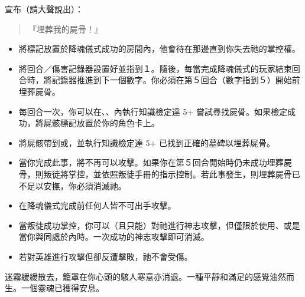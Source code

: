 宣布（請大聲說出）：
\begin{quote}
  『埋葬我的屍骨！』
\end{quote}
\vspace*{-1em}
\begin{itemize}
  \item 將標記放置於降魂儀式成功的房間內，他會待在那邊直到你失去祂的掌控權。
  \item 將回合／傷害記錄器設置好並指到１。隨後，每當完成降魂儀式的玩家結束回合時，將記錄器推進到下一個數字。你必須在第５回合（數字指到５）開始前埋葬屍骨。
  \item 每回合一次，你可以在、、內執行知識檢定達 5+ 嘗試尋找屍骨。如果檢定成功，將屍骸標記放置於你的角色卡上。
  \item 將屍骸帶到或，並執行知識檢定達 5+ 已找到正確的墓碑以埋葬屍骨。
  \item 當你完成此事，將不再可以攻擊。如果你在第５回合開始時仍未成功埋葬屍骨，則叛徒將掌控，並依照叛徒手冊的指示控制。若此事發生，則埋葬屍骨已不足以安撫，你必須消滅祂。
\end{itemize}

\vspace*{-1em}
\begin{itemize}
  \item 在降魂儀式完成前任何人皆不可出手攻擊。
  \item 當叛徒成功掌控，你可以（且只能）對祂進行神志攻擊，但僅限於使用、或是當你與同處於內時。一次成功的神志攻擊即可消滅。
  \item 若對英雄進行攻擊但卻反遭擊敗，祂不會受傷。
\end{itemize}

\begin{HauntStory}
  迷霧緩緩散去，籠罩在你心頭的駭人寒意亦消退。一種平靜和滿足的感覺油然而生。一個靈魂已獲得安息。
\end{HauntStory}
